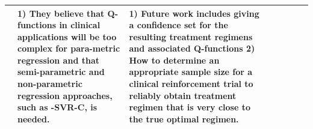 \begin{table}[!th]
\begin{tabular}{|p{3 em}|p{3 em}|p{3 em}|p{3em}|p{6em}|p{9em}|p{6 em}|p{6em}|}
& 
\textbf{1)} They believe that Q-functions in clinical applications will be too complex for para-metric regression and that semi-parametric and non-parametric regression approaches, such as -SVR-C, is needed.
& 
\textbf{1)} Future work includes giving a confidence set for the resulting treatment regimens and associated Q-functions
\textbf{2)} How to determine an appropriate sample size for a clinical reinforcement trial to reliably obtain treatment regimen that is very close to the true optimal regimen.
   \\\midrule
\end{tabular}
\vspace*{-2em}
\end{table}   

